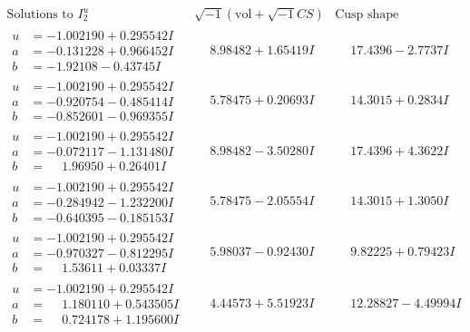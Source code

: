 \documentclass[1p]{elsarticle_modified}
\theoremstyle{definition}
\newcommand{\I}{\sqrt{-1}}
\begin{document}
$$\begin{array}{c|c|c}  
\text{Solutions to }I^u_{2}& \I (\text{vol} + \sqrt{-1}CS) & \text{Cusp shape}\\
 \hline 
\begin{aligned}
u &= -1.002190 + 0.295542 I \\
a &= -0.131228 + 0.966452 I \\
b &= -1.92108 - 0.43745 I\end{aligned}
 & \phantom{-}8.98482 + 1.65419 I & \phantom{-}17.4396 - 2.7737 I \\ \hline\begin{aligned}
u &= -1.002190 + 0.295542 I \\
a &= -0.920754 - 0.485414 I \\
b &= -0.852601 - 0.969355 I\end{aligned}
 & \phantom{-}5.78475 + 0.20693 I & \phantom{-}14.3015 + 0.2834 I \\ \hline\begin{aligned}
u &= -1.002190 + 0.295542 I \\
a &= -0.072117 - 1.131480 I \\
b &= \phantom{-}1.96950 + 0.26401 I\end{aligned}
 & \phantom{-}8.98482 - 3.50280 I & \phantom{-}17.4396 + 4.3622 I \\ \hline\begin{aligned}
u &= -1.002190 + 0.295542 I \\
a &= -0.284942 - 1.232200 I \\
b &= -0.640395 - 0.185153 I\end{aligned}
 & \phantom{-}5.78475 - 2.05554 I & \phantom{-}14.3015 + 1.3050 I \\ \hline\begin{aligned}
u &= -1.002190 + 0.295542 I \\
a &= -0.970327 - 0.812295 I \\
b &= \phantom{-}1.53611 + 0.03337 I\end{aligned}
 & \phantom{-}5.98037 - 0.92430 I & \phantom{-}9.82225 + 0.79423 I \\ \hline\begin{aligned}
u &= -1.002190 + 0.295542 I \\
a &= \phantom{-}1.180110 + 0.543505 I \\
b &= \phantom{-}0.724178 + 1.195600 I\end{aligned}
 & \phantom{-}4.44573 + 5.51923 I & \phantom{-}12.28827 - 4.49994 I \\ \hline\begin{aligned}

\end{aligned}
\end{array}$$
\end{document}
